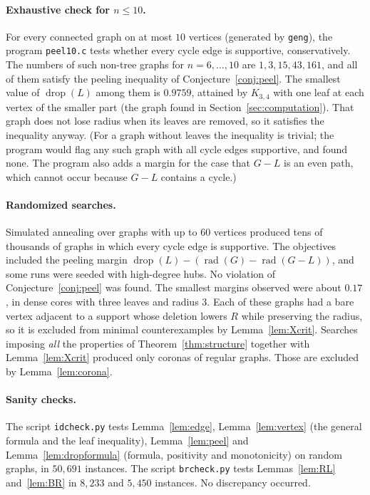 \documentclass[11pt,a4paper]{article}
\theoremstyle{definition}
\newcommand{\rad}{\operatorname{rad}}
\newcommand{\drop}{\operatorname{drop}}
\begin{document}
\paragraph{Exhaustive check for $n\le10$.}
For every connected graph on at most $10$ vertices (generated by \texttt{geng}), the program \texttt{peel10.c} tests whether every cycle edge is supportive, conservatively. The numbers of such non-tree graphs for $n=6,\dots,10$ are $1,3,15,43,161$, and all of them satisfy the peeling inequality of Conjecture~\ref{conj:peel}. The smallest value of $\drop(L)$ among them is $0.9759$, attained by $K_{3,4}$ with one leaf at each vertex of the smaller part (the graph found in Section~\ref{sec:computation}). That graph does not lose radius when its leaves are removed, so it satisfies the inequality anyway. (For a graph without leaves the inequality is trivial; the program would flag any such graph with all cycle edges supportive, and found none. The program also adds a margin for the case that $G-L$ is an even path, which cannot occur because $G-L$ contains a cycle.)

\paragraph{Randomized searches.}
Simulated annealing over graphs with up to $60$ vertices produced tens of thousands of graphs in which every cycle edge is supportive. The objectives included the peeling margin $\drop(L)-(\rad(G)-\rad(G-L))$, and some runs were seeded with high-degree hubs. No violation of Conjecture~\ref{conj:peel} was found. The smallest margins observed were about $0.17$, in dense cores with three leaves and radius $3$. Each of these graphs had a bare vertex adjacent to a support whose deletion lowers $R$ while preserving the radius, so it is excluded from minimal counterexamples by Lemma~\ref{lem:Xcrit}. Searches imposing \emph{all} the properties of Theorem~\ref{thm:structure} together with Lemma~\ref{lem:Xcrit} produced only coronas of regular graphs. Those are excluded by Lemma~\ref{lem:corona}.

\paragraph{Sanity checks.}
The script \texttt{idcheck.py} tests Lemma~\ref{lem:edge}, Lemma~\ref{lem:vertex} (the general formula and the leaf inequality), Lemma~\ref{lem:peel} and Lemma~\ref{lem:dropformula} (formula, positivity and monotonicity) on random graphs, in $50{,}691$ instances. The script \texttt{brcheck.py} tests Lemmas~\ref{lem:RL} and~\ref{lem:BR} in $8{,}233$ and $5{,}450$ instances. No discrepancy occurred.
\end{document}
